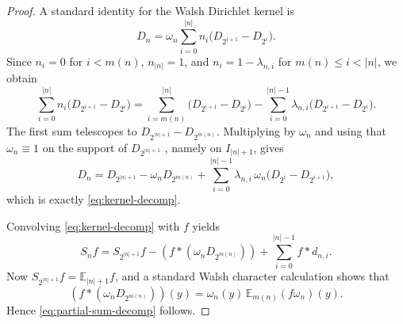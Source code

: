 \documentclass[10pt,a4paper]{amsart}
\begin{document}
\begin{proof}
A standard identity for the Walsh Dirichlet kernel is 
\begin{equation}
D_n=\omega_n\sum_{i=0}^{|n|}n_i\bigl(D_{2^{i+1}}-D_{2^i}\bigr).
\label{eq:dir-standard}
\end{equation}
Since $n_i=0$ for $i<m(n)$, $n_{|n|}=1$, and $n_i=1-\lambda_{n,i}$ for $%
m(n)\le i<|n|$, we obtain 
\begin{equation*}
\sum_{i=0}^{|n|}n_i\bigl(D_{2^{i+1}}-D_{2^i}\bigr)
= \sum_{i=m(n)}^{|n|}\bigl(D_{2^{i+1}}-D_{2^i}\bigr)
- \sum_{i=0}^{|n|-1}\lambda_{n,i}\bigl(D_{2^{i+1}}-D_{2^i}\bigr). 
\end{equation*}
The first sum telescopes to $D_{2^{|n|+1}}-D_{2^{m(n)}}$. Multiplying by $%
\omega_n$ and using that $\omega_n\equiv1$ on the support of $D_{2^{|n|+1}}$%
, namely on $I_{|n|+1}$, gives 
\begin{equation*}
D_n = D_{2^{|n|+1}}-\omega_n D_{2^{m(n)}}
+\sum_{i=0}^{|n|-1}\lambda_{n,i}\,\omega_n\bigl(D_{2^i}-D_{2^{i+1}}\bigr), 
\end{equation*}
which is exactly \eqref{eq:kernel-decomp}.

Convolving \eqref{eq:kernel-decomp} with $f$ yields 
\begin{equation*}
S_n f= S_{2^{|n|+1}}f-(f*(\omega_nD_{2^{m(n)}}))+
\sum_{i=0}^{|n|-1}f*d_{n,i}. 
\end{equation*}
Now $S_{2^{|n|+1}}f=\mathbb{E}_{|n|+1}f$, and a standard Walsh character calculation shows that 
\begin{equation*}
(f*(\omega_nD_{2^{m(n)}}))(y)=\omega_n(y)\,\mathbb{E}_{m(n)}(f\omega_n)(y). 
\end{equation*}
Hence \eqref{eq:partial-sum-decomp} follows.
\end{proof}
\end{document}
